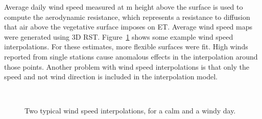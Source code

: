 \documentclass[reviewcopy]{elsart}
\begin{document}
Average daily wind speed measured at \unit[2]{m} height above the
surface is used to compute the aerodynamic resistance, which
represents a resistance to diffusion that air above the vegetative
surface imposes on \ac{ET}. Average wind speed maps were generated
using 3D \ac{RST}.  Figure~\ref{fig:ws} shows some example wind speed
interpolations.  For these estimates, more flexible surfaces were fit.
High winds reported from single stations cause anomalous effects
in the interpolation around those points.  Another problem with wind
speed interpolations is that only the speed and not wind
direction is included in the interpolation model.

\begin{figure}[htbp]
  \centering
  \mbox{
    \quad
  }
  \caption{
%
    Two typical wind speed interpolations, for a
    calm and a windy day.
%
  }
  \label{fig:ws}
\end{figure}
\end{document}
